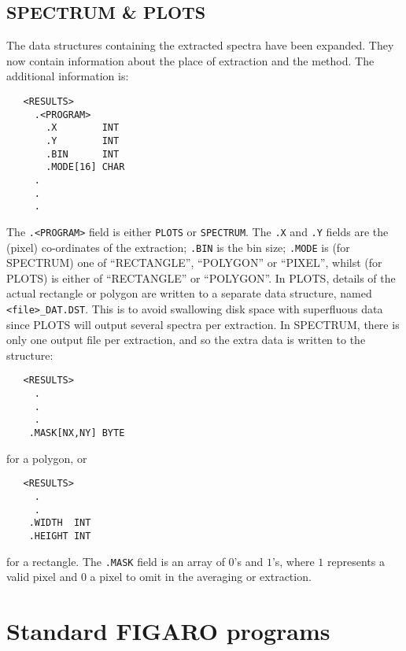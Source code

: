 \subsection{SPECTRUM \& PLOTS}

The data structures containing the extracted spectra have been expanded.
They now contain information about the place of extraction and the method.
The additional information is:

\begin{myquote}
\begin{verbatim}
   <RESULTS>
     .<PROGRAM>
       .X        INT
       .Y        INT
       .BIN      INT
       .MODE[16] CHAR
     .
     .
     .
\end{verbatim}
\end{myquote}

The {\tt .<PROGRAM>} field is either {\tt PLOTS} or {\tt SPECTRUM}.
The {\tt .X} and {\tt .Y} fields are the (pixel) co-ordinates of the
extraction; {\tt .BIN} is the bin size; {\tt .MODE} is (for SPECTRUM) one of
``RECTANGLE'', ``POLYGON'' or ``PIXEL'', whilst (for PLOTS) is either of
``RECTANGLE'' or ``POLYGON''. In PLOTS, details of the actual rectangle
or polygon are written to a separate data structure, named {\tt
<file>\_DAT.DST}. This is to avoid swallowing disk space with superfluous data
since PLOTS will output several spectra per extraction.
In SPECTRUM, there is only one output file per extraction, and so the extra
data is written to the structure:

\begin{myquote}
\begin{verbatim}
   <RESULTS>
     .
     .
     .
    .MASK[NX,NY] BYTE
\end{verbatim}
\end{myquote}

for a polygon, or

\begin{myquote}
\begin{verbatim}
   <RESULTS>
     .
     .
    .WIDTH  INT
    .HEIGHT INT
\end{verbatim}
\end{myquote}

for a rectangle. The {\tt .MASK} field is an array of $0$'s and $1$'s, where
$1$ represents a valid pixel and $0$ a pixel to omit in the averaging or
extraction.

\section{Standard FIGARO programs{}}
\label{sec:figaro}

